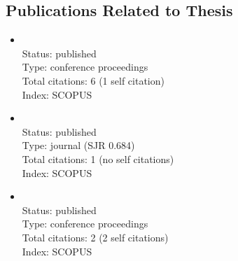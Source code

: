 \begin{refsection}
\section*{Publications Related to Thesis}
    \begin{itemize}
		\item{}\vspace{2mm}\\Status: published\\Type: conference proceedings\\Total citations: 6 (1 self citation)\\Index: SCOPUS
		\item{}\vspace{2mm}\\Status: published\\Type: journal (SJR 0.684)\\Total citations: 1 (no self citations)\\Index: SCOPUS
		\item{}\vspace{2mm}\\Status: published\\Type: conference proceedings\\Total citations: 2 (2 self citations)\\Index: SCOPUS
\end{itemize}

\newpage

\end{refsection}
